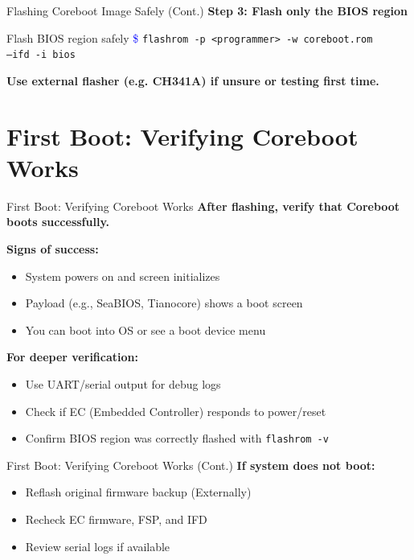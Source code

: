 \documentclass{beamer}
\begin{document}
	
	
	\begin{frame}{Flashing Coreboot Image Safely (Cont.)}
		\textbf{Step 3: Flash only the BIOS region}
		\begin{exampleblock}{Flash BIOS region safely}
			\textcolor{blue}{\$} \texttt{flashrom -p <programmer> -w coreboot.rom \\
				\hspace*{2.8em}--ifd -i bios}
		\end{exampleblock}
		
		\vspace{1cm}
		\textbf{Use external flasher (e.g. CH341A) if unsure or testing first time.}
		
	\end{frame}
	
	
	
	
	
	\section{First Boot: Verifying Coreboot Works}
	\begin{frame}{First Boot: Verifying Coreboot Works}
		\textbf{After flashing, verify that Coreboot boots successfully.}
		
		\textbf{Signs of success:}
		\begin{itemize}
			\item System powers on and screen initializes
			\item Payload (e.g., SeaBIOS, Tianocore) shows a boot screen
			\item You can boot into OS or see a boot device menu
		\end{itemize}
		
		\textbf{For deeper verification:}
		\begin{itemize}
			\item Use UART/serial output for debug logs
			\item Check if EC (Embedded Controller) responds to power/reset
			\item Confirm BIOS region was correctly flashed with \texttt{flashrom -v}
		\end{itemize}
	\end{frame}
	
	
	
	\begin{frame}{First Boot: Verifying Coreboot Works (Cont.)}
		\textbf{If system does not boot:}
		\begin{itemize}
			\item Reflash original firmware backup (Externally)
			\item Recheck EC firmware, FSP, and IFD
			\item Review serial logs if available
		\end{itemize}
	\end{frame}
	
\end{document}
